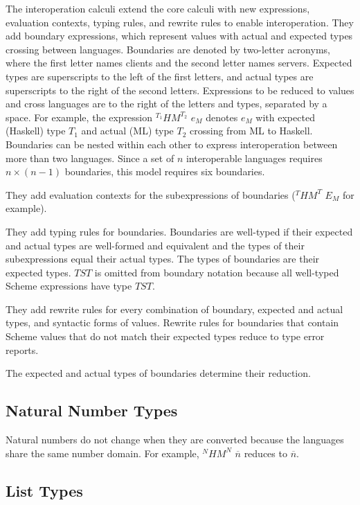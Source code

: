 The interoperation calculi extend the core calculi with new expressions, evaluation contexts, typing rules, and rewrite rules to enable interoperation.  They add boundary expressions, which represent values with actual and expected types crossing between languages.  Boundaries are denoted by two-letter acronyms, where the first letter names clients and the second letter names servers.  Expected types are superscripts to the left of the first letters, and actual types are superscripts to the right of the second letters.  Expressions to be reduced to values and cross languages are to the right of the letters and types, separated by a space.  For example, the expression $^{T_{1}}HM^{T_{2}}$ $e_{M}$ denotes $e_{M}$ with expected (Haskell) type $T_{1}$ and actual (ML) type $T_{2}$ crossing from ML to Haskell.  Boundaries can be nested within each other to express interoperation between more than two languages.  Since a set of $n$ interoperable languages requires $n\times(n-1)$ boundaries, this model requires six boundaries.

They add evaluation contexts for the subexpressions of boundaries ($^{T}HM^{T}$ $E_{M}$ for example).

They add typing rules for boundaries.  Boundaries are well-typed if their expected and actual types are well-formed and equivalent and the types of their subexpressions equal their actual types.  The types of boundaries are their expected types.  $TST$ is omitted from boundary notation because all well-typed Scheme expressions have type $TST$.

They add rewrite rules for every combination of boundary, expected and actual types, and syntactic forms of values.  Rewrite rules for boundaries that contain Scheme values that do not match their expected types reduce to type error reports.

The expected and actual types of boundaries determine their reduction.

\subsection{Natural Number Types}

Natural numbers do not change when they are converted because the languages share the same number domain.  For example, $^{N}HM^{N}$ $\overline{n}$ reduces to $\overline{n}$.

\subsection{List Types}

